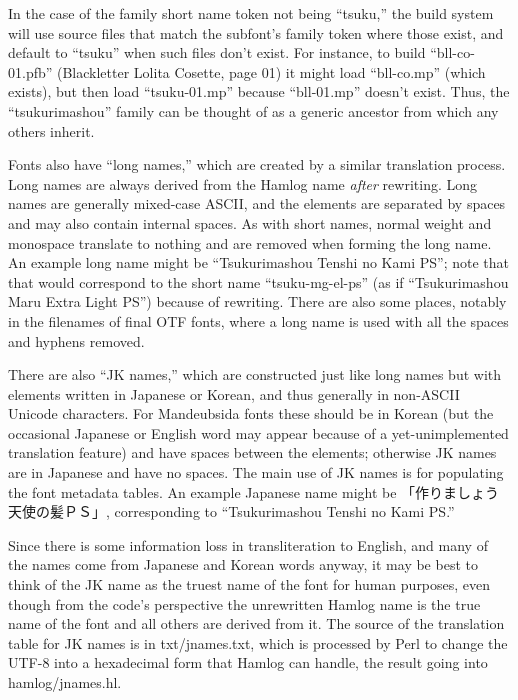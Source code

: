 \documentclass[14pt]{extarticle}
\begin{document}
In the case of the family short name token not being ``tsuku,'' the build
system will use source files that match the subfont's family token where
those exist, and default to ``tsuku'' when such files don't exist.  For
instance, to build ``bll-co-01.pfb'' (Blackletter Lolita Cosette, page 01)
it might load ``bll-co.mp'' (which exists), but then load ``tsuku-01.mp''
because ``bll-01.mp'' doesn't exist.  Thus, the ``tsukurimashou'' family can
be thought of as a generic ancestor from which any others inherit.

Fonts also have ``long names,'' which are created by a similar translation
process.  Long names are always derived from the Hamlog name \emph{after}
rewriting.  Long names are generally mixed-case ASCII, and the elements are
separated by spaces and may also contain internal spaces.  As with short
names, normal weight and monospace translate to nothing and are removed when
forming the long name.  An example long name might be ``Tsukurimashou Tenshi
no Kami PS''; note that that would correspond to the short name
``tsuku-mg-el-ps'' (as if ``Tsukurimashou Maru Extra Light PS'') because of
rewriting.  There are also some places, notably in the filenames of final
OTF fonts, where a long name is used with all the spaces and hyphens
removed.

There are also ``JK names,'' which are constructed just like long names but
with elements written in Japanese or Korean, and thus generally in non-ASCII
Unicode characters.  For Mandeubsida fonts these should be in Korean (but the
occasional Japanese or English word may appear because of a
yet-unimplemented translation feature) and have spaces between the elements;
otherwise JK names are in Japanese and have no spaces.  The main use of JK
names is for populating the font metadata tables.  An example Japanese name
might be 「作りましょう天使の髪ＰＳ」, corresponding to ``Tsukurimashou
Tenshi no Kami PS.''

Since there is some information loss in transliteration to English, and many
of the names come from Japanese and Korean words anyway, it may be best to
think of the JK name as the truest name of the font for human purposes, even
though from the code's perspective the unrewritten Hamlog name is the true
name of the font and all others are derived from it.  The source of the
translation table for JK names is in txt/jnames.txt, which is processed by
Perl to change the UTF-8 into a hexadecimal form that Hamlog can handle, the
result going into hamlog/jnames.hl.

\end{document}
